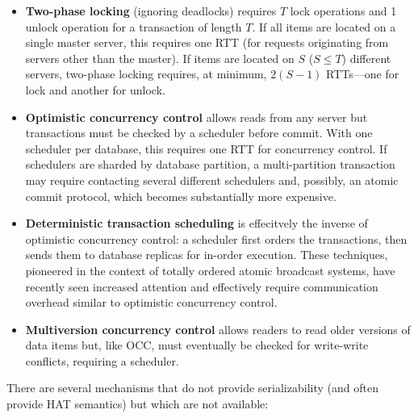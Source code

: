 \begin{itemize}
\item \textbf{Two-phase locking} (ignoring deadlocks) requires $T$
  lock operations and 1 unlock operation for a transaction of length
  $T$. If all items are located on a single master server, this
  requires one RTT (for requests originating from servers other than
  the master). If items are located on $S$ ($S \leq T$) different
  servers, two-phase locking requires, at minimum, $2(S-1)$ RTTs---one
  for lock and another for unlock.

\item \textbf{Optimistic concurrency control} allows reads from any
  server but transactions must be checked by a scheduler before
  commit. With one scheduler per database, this requires one RTT for
  concurrency control. If schedulers are sharded by database
  partition, a multi-partition transaction may require contacting
  several different schedulers and, possibly, an atomic commit
  protocol, which becomes substantially more expensive.

\item \textbf{Deterministic transaction scheduling} is effecitvely the
  inverse of optimistic concurrency control: a scheduler first orders
  the transactions, then sends them to database replicas for in-order
  execution. These techniques, pioneered in the context of totally
  ordered atomic broadcast systems, have recently seen increased
  attention and effectively require communication overhead similar to
  optimistic concurrency control.

\item\textbf{Multiversion concurrency control} allows readers to read
  older versions of data items but, like OCC, must eventually be
  checked for write-write conflicts, requiring a scheduler.

\end{itemize}

There are several mechanisms that do not provide serializability (and
often provide HAT semantics) but which are not available:

